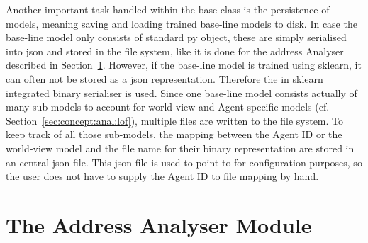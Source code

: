 Another important task handled within the base class is the persistence of models, meaning saving and loading trained base-line models to disk.
In case the base-line model only consists of standard \gls{py} object, these are simply serialised into \gls{json} and stored in the file system, like it is done for the address Analyser described in Section~\ref{sec:impl:addr}.
However, if the base-line model is trained using \gls{sklearn}, it can often not be stored as a \gls{json} representation. Therefore the in \gls{sklearn} integrated binary serialiser is used. Since one base-line model consists actually of many sub-models to account for world-view and Agent specific models (cf. Section~\ref{sec:concept:anal:lof}), multiple files are written to the file system. To keep track of all those sub-models, the mapping between the Agent ID or the world-view model and the file name for their binary representation are stored in an central \gls{json} file. This \gls{json} file is used to point to for configuration purposes, so the user does not have to supply the Agent ID to file mapping by hand.

\section{The Address Analyser Module}
\label{sec:impl:addr}

\begin{comment}
\begin{itemize}
	\item purpose is to detect the usage of prior unknown addresses
	\item (might) detect new (not malicious) devices
	\item stores all occurring source and destination addresses during the training period in a separately in a set
	\item set is stored to the disk using the standard \gls{py} \gls{json} serialiser
	\item during normal analytical operation the module checks if occurring addresses already occured in the training phase
	\item if not so counters are increased
	\item \todo{and list of unknown addresses is exported}
	\item exported metrics: \code{unknown\_src\_addr}, \code{unknown\_src\_telegrams}, \code{unknown\_dest\_addr}, \code{unknown\_dest\_telegrams}, \code{unknown\_addr}, \code{unknown\_telegrams}
\end{itemize}
\end{comment}

